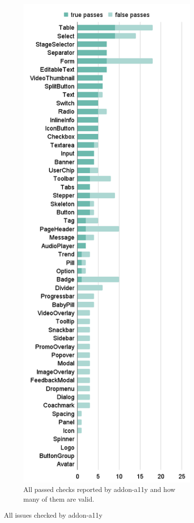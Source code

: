 \documentclass{master_thesis}
\begin{document}
\begin{figure}[H]
\begin{subfigure}{0.45\textwidth}
	\label{fig:audit-failed}
	\end{subfigure}
	\hspace{0.05\textwidth}
	\begin{subfigure}{0.45\textwidth}
	\includegraphics[height=0.9\textheight]{img/audit-passed.png}
	\caption{All passed checks reported by addon-a11y and how many of them are valid.}
	\label{fig:audit-passed}
	\end{subfigure}
\caption{All issues checked by addon-a11y}
\label{fig:audit-passed-failed}
\end{figure}
\end{document}

